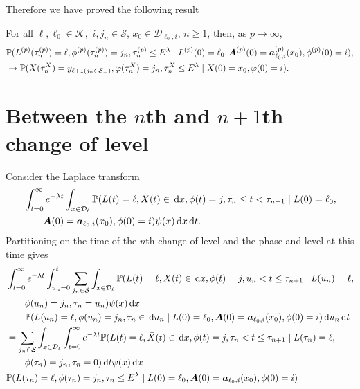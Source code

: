 Therefore we have proved the following result 
\begin{lem}\label{lem: kKKJJJF}
	For all \(\ell,\ell_0\in\mathcal K,\) \(i,j_n\in\mathcal S\), \(x_0\in\mathcal D_{\ell_0,i}\), \(n\geq 1\), then, as \(p\to\infty\),
	\begin{align}
		&\mathbb P(L^{(p)}(\tau_n^{(p)}) = \ell, \phi^{(p)}(\tau_n^{(p)}) = j_n, \tau_{n}^{(p)}\leq E^{\lambda}
		 \mid L^{(p)}(0)=\ell_0, \boldsymbol A^{(p)}(0)=\boldsymbol  a_{\ell_0,i}^{(p)}(x_0), \phi^{(p)}(0)=i),\nonumber 
		 \\&\to \mathbb P(X(\tau_n^X) = y_{\ell+1(j_{n}\in\mathcal S_-)}, 
		\varphi(\tau_n^X) = j_n, \tau_{n}^X\leq E^\lambda
		\mid X(0)=x_0, \varphi(0)=i).
	\end{align}
\end{lem} 

\section{Between the \(n\)th and \(n+1\)th change of level}\label{sec: between n and np1}
Consider the Laplace transform 
\begin{align}
		\nonumber&\int_{t=0}^\infty e^{-\lambda t}\int_{x\in\mathcal{D}_\ell}\mathbb P(L(t) = \ell, \bar X(t)\in\, \mathrm{d} x, \phi(t) = j, \tau_{n}\leq t<\tau_{n+1} \mid L(0)=\ell_0, 
		\\&\qquad \boldsymbol A(0)=\boldsymbol a_{\ell_0,i}(x_0), \phi(0)=i)\psi(x)\, \mathrm{d} x\, \mathrm{d} t.
\end{align}
Partitioning on the time of the \(n\)th change of level and the phase and level at this time gives
\begin{align}
	&\int_{t=0}^\infty e^{-\lambda t} \int_{u_n=0}^t\sum_{j_n\in\mathcal S}
	\int_{x\in\mathcal{D}_\ell}\mathbb P(L(t) = \ell, \bar X(t) \in \, \mathrm{d} x, \phi(t) = j, 
	u_n<t \leq \tau_{n+1} \mid L(u_n) = \ell, \nonumber 
	 \\&\qquad{}\phi(u_n) = j_n, \tau_{n}= u_n)\psi(x)\, \mathrm{d} x \nonumber
	 \\&\qquad{}\mathbb P(L(u_n) = \ell, \phi(u_n) = j_n, \tau_{n}\in \, \mathrm{d} u_n 
	 \mid L(0)=\ell_0, \boldsymbol A(0)=\boldsymbol  a_{\ell_0,i}(x_0), \phi(0)=i)\, \mathrm{d} u_n\, \mathrm{d} t \nonumber 
	 \\&= \sum_{j_n\in\mathcal S}
	\int_{x\in\mathcal{D}_\ell} \int_{t=0}^\infty e^{-\lambda t} \mathbb P(L(t) = \ell, \bar X(t) \in \, \mathrm{d} x, \phi(t) = j, 
	\tau_n<t \leq \tau_{n+1} \mid L(\tau_n) = \ell, \nonumber 
	 \\&\qquad{}\phi(\tau_n) = j_n, \tau_{n}= 0)\, \mathrm{d} t \psi(x)\, \mathrm{d} x \nonumber
	 \\&\mathbb P(L(\tau_n) = \ell, \phi(\tau_n) = j_n, \tau_{n}\leq E^\lambda 
	 \mid L(0)=\ell_0, \boldsymbol A(0)=\boldsymbol  a_{\ell_0,i}(x_0), \phi(0)=i) \label{eqn: l whkrqvlkjbrd}
\end{align}
